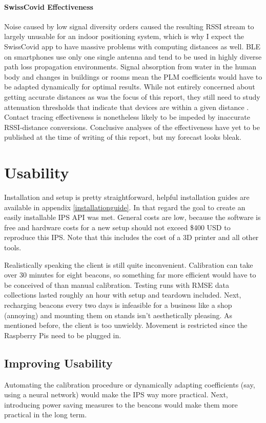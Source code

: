 \documentclass[a4paper, oneside]{ipsreport}
\begin{document}
\paragraph{SwissCovid Effectiveness}
Noise caused by low signal diversity orders caused the resulting RSSI stream to largely unusable for an indoor positioning system, which is why I expect the SwissCovid app to have massive problems with computing distances as well. BLE on smartphones use only one single antenna and tend to be used in highly diverse path loss propagation environments. Signal absorption from water in the human body and changes in buildings or rooms mean the PLM coefficients would have to be adapted dynamically for optimal results. While not entirely concerned about getting accurate distances as was the focus of this report, they still need to study attenuation thresholds that indicate that devices are within a given distance \autocite{SwissCovid, SwissCovidGithub}. Contact tracing effectiveness is nonetheless likely to be impeded by inaccurate RSSI-distance conversions. Conclusive analyses of the effectiveness have yet to be published at the time of writing of this report, but my forecast looks bleak.

\section{Usability}
Installation and setup is pretty straightforward, helpful installation guides are available in appendix \ref{installationguide}. In that regard the goal to create an easily installable IPS API was met. General costs are low, because the software is free and hardware costs for a new setup should not exceed \$400 USD to reproduce this IPS. Note that this includes the cost of a 3D printer and all other tools.

Realistically speaking the client is still quite inconvenient. Calibration can take over 30 minutes for eight beacons, so something far more efficient would have to be conceived of than manual calibration. Testing runs with RMSE data collections lasted roughly an hour with setup and teardown included. Next, recharging beacons every two days is infeasible for a business like a shop (annoying) and mounting them on stands isn't aesthetically pleasing. As mentioned before, the client is too unwieldy. Movement is restricted since the Raspberry Pis need to be plugged in.

\subsection{Improving Usability}
Automating the calibration procedure or dynamically adapting coefficients (say, using a neural network) would make the IPS way more practical. Next, introducing power saving measures to the beacons would make them more practical in the long term.
\end{document}
